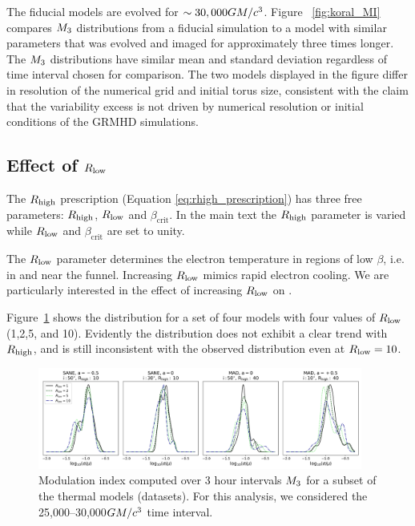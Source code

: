 The fiducial models are evolved for $\sim 30,000 GM/c^3$.
Figure ~\ref{fig:koral_MI} compares $M_{3}$ distributions from a fiducial \kharma simulation to a \koral model with similar parameters that was evolved and imaged for approximately three times longer.
The $M_{3}$ distributions have similar mean and standard deviation regardless of time interval chosen for comparison.
The two models displayed in the figure differ in resolution of the numerical grid and initial torus size, consistent with the claim that the variability excess is not driven by numerical resolution or initial conditions of the GRMHD simulations.

\subsection{Effect of \texorpdfstring{$R_\mathrm{low}$}{Rlow}}

The $R_\mathrm{high}$ prescription (Equation \ref{eq:rhigh_prescription}) has three free parameters: $R_\mathrm{high}$, $R_\mathrm{low}$ and $\beta_\mathrm{crit}$.
In the main text the $R_\mathrm{high}$ parameter is varied while $R_\mathrm{low}$ and $\beta_\mathrm{crit}$ are set to unity.

The $R_\mathrm{low}$ parameter determines the electron temperature in regions of low $\beta$, i.e. in and near the funnel.
Increasing $R_\mathrm{low}$ mimics rapid electron cooling.
We are particularly interested in the effect of increasing $R_\mathrm{low}$ on .

Figure~\ref{fig:mi_rlow} shows the  distribution for a set of four \kharma models with four values of $R_\mathrm{low}$ (1,2,5, and 10).
Evidently the  distribution does not exhibit a clear trend with $R_\mathrm{high}$, and is still inconsistent with the observed distribution even at $R_\mathrm{low} = 10$.

\begin{figure}
  \centering
  \includegraphics[width=0.95\textwidth]{figures/mi_rlow_select_models.png}
  \caption{Modulation index computed over 3 hour intervals $M_{3}$ for a subset of the thermal models (\kharma datasets).
For this analysis, we considered the 25,000--30,000$GM/c^3$ time interval.}
  \label{fig:mi_rlow}
\end{figure}

